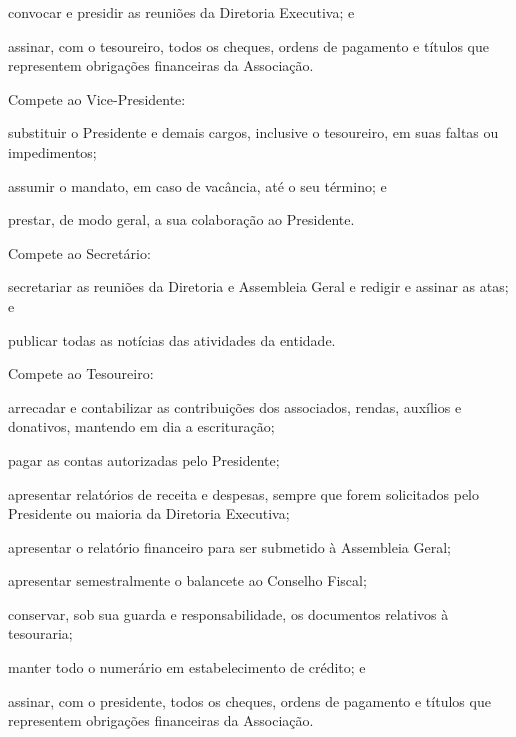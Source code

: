 \documentclass{estatuto}
\begin{document}
\begin{artigos}
\begin{itens}
					\item convocar e presidir as reuniões da Diretoria Executiva; e
					\item assinar, com o tesoureiro, todos os cheques, ordens de pagamento e títulos que representem obrigações financeiras da Associação.
				\end{itens}
			\item Compete ao Vice-Presidente:
				\begin{itens}
					\item substituir o Presidente e demais cargos, inclusive o tesoureiro, em suas faltas ou impedimentos;
					\item assumir o mandato, em caso de vacância, até o seu término; e
					\item prestar, de modo geral, a sua colaboração ao Presidente.
				\end{itens}
			\item Compete ao Secretário:
				\begin{itens}
					\item secretariar as reuniões da Diretoria e Assembleia Geral e redigir e assinar as atas; e
					\item publicar todas as notícias das atividades da entidade.
				\end{itens}
			\item Compete ao Tesoureiro:
				\begin{itens}
					\item arrecadar e contabilizar as contribuições dos associados, rendas, auxílios e donativos, mantendo em dia a escrituração;
					\item pagar as contas autorizadas pelo Presidente;
					\item apresentar relatórios de receita e despesas, sempre que forem solicitados pelo Presidente ou maioria da Diretoria Executiva;
					\item apresentar o relatório financeiro para ser submetido à Assembleia Geral;
					\item apresentar semestralmente o balancete ao Conselho Fiscal;
					\item conservar, sob sua guarda e responsabilidade, os documentos relativos à tesouraria;
					\item manter todo o numerário em estabelecimento de crédito; e
					\item assinar, com o presidente, todos os cheques, ordens de pagamento e títulos que representem obrigações financeiras da Associação.
				\end{itens}

\end{artigos}
\end{document}
